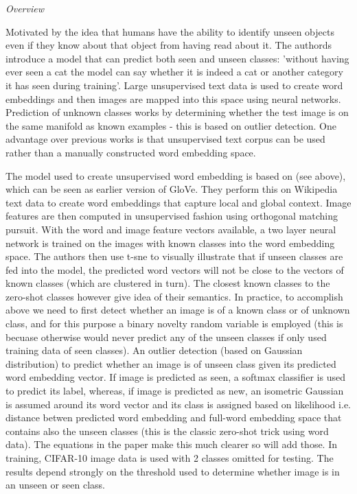 \documentclass[12pt]{report}
\begin{document}
\textit{Overview}

Motivated by the idea that humans have the ability to identify unseen objects even if they know about that object from having read about it. The authords introduce a model that can predict both seen and unseen classes: 'without having ever seen a cat the model can say whether it is indeed a cat or another category it has seen during training'. Large unsupervised text data is used to create word embeddings and then images are mapped into this space using neural networks. Prediction of unknown classes works by determining whether the test image is on the same manifold as known examples - this is based on outlier detection. One advantage over previous works is that unsupervised text corpus can be used rather than a manually constructed word embedding space.

The model used to create unsupervised word embedding is based on \cite{HuangWordemb} (see above), which can be seen as earlier version of GloVe. They perform this on Wikipedia text data to create word embeddings that capture local and global context. Image features are then computed in unsupervised fashion using orthogonal matching pursuit. With the word and image feature vectors available, a two layer neural network is trained on the images with known classes into the word embedding space. The authors then use t-sne to visually illustrate that if unseen classes are fed into the model, the predicted word vectors will not be close to the vectors of known classes (which are clustered in turn). The closest known classes to the zero-shot classes however give idea of their semantics. In practice, to accomplish above we need to first detect whether an image is of a known class or of unknown class, and for this purpose a binary novelty random variable is employed (this is becuase otherwise would never predict any of the unseen classes if only used training data of seen classes). An outlier detection (based on Gaussian distribution) to predict whether an image is of unseen class given its predicted word embedding vector. If image is predicted as seen, a softmax classifier is used to predict its label, whereas, if image is predicted as new, an isometric Gaussian is assumed around its word vector and its class is assigned based on likelihood i.e. distance betwen predicted word embedding and full-word embedding space that contains also the unseen classes (this is the classic zero-shot trick using word data). The equations in the paper make this much clearer so will add those. In training, CIFAR-10 image data is used with 2 classes omitted for testing. The results depend strongly on the threshold used to determine whether image is in an unseen or seen class.
\end{document}
